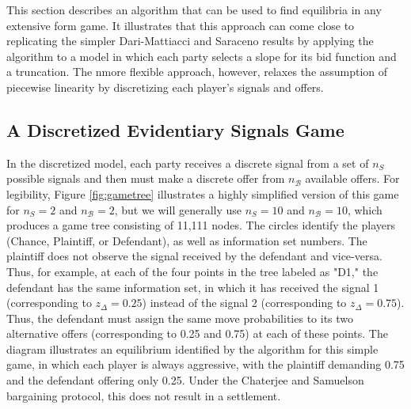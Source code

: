 \documentclass{article}
\begin{document}
This section describes an algorithm that can be used to find equilibria in any extensive form game. It illustrates that this approach can come close to replicating the simpler Dari-Mattiacci and Saraceno results by applying the algorithm to a model in which each party selects a slope for its bid function and a truncation. The nmore flexible approach, however, relaxes the assumption of piecewise linearity by discretizing each player's signals and offers. 

\subsection{A Discretized Evidentiary Signals Game} 

In the discretized model, each party receives a discrete signal from a set of $n_S$ possible signals and then must make a discrete offer from $n_{\mathcal{B}}$ available offers. For legibility, Figure \ref{fig:gametree} illustrates a highly simplified version of this game for  $n_S=2$ and $n_{\mathcal{B}}=2$, but we will generally use  $n_S=10$ and $n_{\mathcal{B}}=10$, which produces a game tree consisting of 11,111 nodes. The circles identify the players (Chance, Plaintiff, or Defendant), as well as information set numbers. The plaintiff does not observe the signal received by the defendant and vice-versa. Thus, for example, at each of the four points in the tree labeled as "D1," the defendant has the same information set, in which it has received the signal 1 (corresponding to $z_\Delta = 0.25$) instead of the signal 2 (corresponding to $z_\Delta = 0.75$). Thus, the defendant must assign the same move probabilities to its two alternative offers (corresponding to 0.25 and 0.75) at each of these points. The diagram illustrates an equilibrium identified by the algorithm for this simple game, in which each player is always aggressive, with the plaintiff demanding 0.75 and the defendant offering only 0.25. Under the Chaterjee and Samuelson bargaining protocol, this does not result in a settlement.
\end{document}
